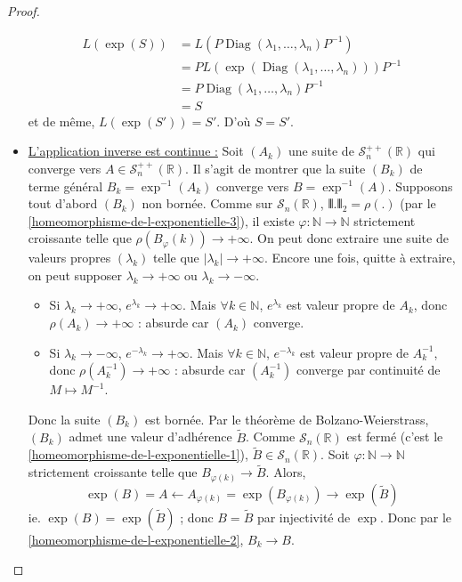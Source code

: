 \begin{proof}
\begin{itemize}
			\begin{align*}
				L(\exp(S)) &= L(P \operatorname{Diag}(\lambda_1, \dots, \lambda_n) P^{-1}) \\
				&= P L(\exp(\operatorname{Diag}(\lambda_1, \dots, \lambda_n))) P^{-1} \\
				&= P \operatorname{Diag}(\lambda_1, \dots, \lambda_n) P^{-1} \\
				&= S
			\end{align*}
			et de même, $L(\exp(S')) = S'$. D'où $S = S'$.
			\item \uline{L'application inverse est continue :} Soit $(A_k)$ une suite de $\mathcal{S}^{++}_n(\mathbb{R})$ qui converge vers $A \in \mathcal{S}^{++}_n(\mathbb{R})$. Il s'agit de montrer que la suite $(B_k)$ de terme général $B_k = \exp^{-1}(A_k)$ converge vers $B = \exp^{-1}(A)$. Supposons tout d'abord $(B_k)$ non bornée. Comme sur $\mathcal{S}_n(\mathbb{R})$, $\VERT . \VERT_2 = \rho(.)$ (par le \cref{homeomorphisme-de-l-exponentielle-3}), il existe $\varphi : \mathbb{N} \rightarrow \mathbb{N}$ strictement croissante telle que $\rho(B_\varphi(k)) \longrightarrow +\infty$. On peut donc extraire une suite de valeurs propres $(\lambda_k)$ telle que $|\lambda_k| \longrightarrow +\infty$. Encore une fois, quitte à extraire, on peut supposer $\lambda_k \longrightarrow +\infty$ ou $\lambda_k \longrightarrow -\infty$.
			\begin{itemize}
				\item Si $\lambda_k \longrightarrow +\infty$, $e^{\lambda_k} \longrightarrow +\infty$. Mais $\forall k \in \mathbb{N}$, $e^{\lambda_k}$ est valeur propre de $A_k$, donc $\rho(A_k) \longrightarrow +\infty$ : absurde car $(A_k)$ converge.
				\item Si $\lambda_k \longrightarrow -\infty$, $e^{-\lambda_k} \longrightarrow +\infty$. Mais $\forall k \in \mathbb{N}$, $e^{-\lambda_k}$ est valeur propre de $A_k^{-1}$, donc $\rho(A_k^{-1}) \longrightarrow +\infty$ : absurde car $(A_k^{-1})$ converge par continuité de $M \mapsto M^{-1}$.
			\end{itemize}
			Donc la suite $(B_k)$ est bornée. Par le théorème de Bolzano-Weierstrass, $(B_k)$ admet une valeur d'adhérence $\widetilde{B}$. Comme $\mathcal{S}_n(\mathbb{R})$ est fermé (c'est le \cref{homeomorphisme-de-l-exponentielle-1}), $\widetilde{B} \in \mathcal{S}_n(\mathbb{R})$.
			\newpar
			Soit $\varphi : \mathbb{N} \rightarrow \mathbb{N}$ strictement croissante telle que $B_{\varphi(k)} \longrightarrow \widetilde{B}$. Alors,
			\[ \exp(B) = A \longleftarrow A_{\varphi(k)} = \exp(B_{\varphi(k)}) \longrightarrow \exp(\widetilde{B}) \]
			ie. $\exp(B) = \exp(\widetilde{B})$ ; donc $B = \widetilde{B}$ par injectivité de $\exp$. Donc par le \cref{homeomorphisme-de-l-exponentielle-2}, $B_k \longrightarrow B$.
		\end{itemize}
	\end{proof}


